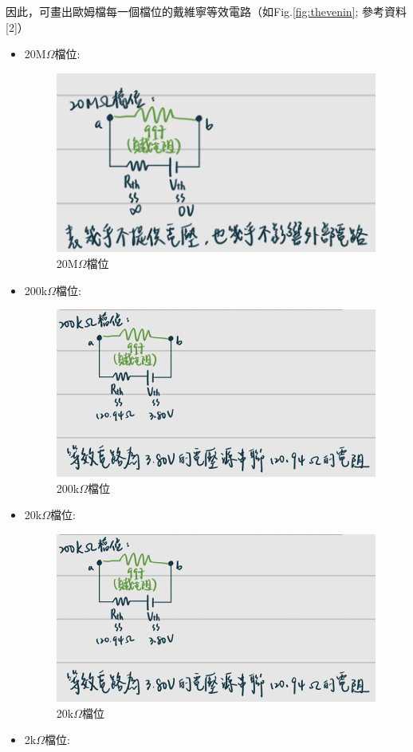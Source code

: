 \documentclass[12pt,a4paper]{article}
\begin{document}
\begin{CJK}{UTF8}{bkai}
因此，可畫出歐姆檔每一個檔位的戴維寧等效電路（如Fig.\ref{fig:thevenin}; 參考資料[2]）
\begin{itemize}
    \item 20M$\Omega$檔位:\\
    \begin{figure}[h]
        \centering
        \includegraphics[width=0.5\linewidth]{figures/20M.png}
        \caption{20M$\Omega$檔位}
        \label{fig:20m}
    \end{figure}
    \item 200k$\Omega$檔位:\\
    \begin{figure}[h]
        \centering
        \includegraphics[width=0.5\linewidth]{figures/200k.png}
        \caption{200k$\Omega$檔位}
        \label{fig:200k}
    \end{figure}
    \clearpage
    \item 20k$\Omega$檔位:\\
    \begin{figure}[h]
        \centering
        \includegraphics[width=0.5\linewidth]{figures/20k.png}
        \caption{20k$\Omega$檔位}
        \label{fig:20k}
    \end{figure}
    \item 2k$\Omega$檔位:\\
    \begin{figure}[h]
        \centering

\end{figure}
\end{itemize}
\end{CJK}
\end{document}
